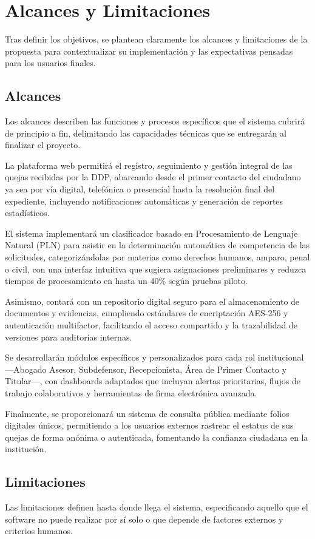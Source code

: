 \section{Alcances y Limitaciones}
Tras definir los objetivos, se plantean claramente los alcances y limitaciones de la propuesta para contextualizar su implementación y las expectativas pensadas para los usuarios finales.

\subsection{Alcances}
Los alcances describen las funciones y procesos específicos que el sistema cubrirá de principio a fin, delimitando las capacidades técnicas que se entregarán al finalizar el proyecto.

La plataforma web permitirá el registro, seguimiento y gestión integral de las quejas recibidas por la DDP, abarcando desde el primer contacto del ciudadano ya sea por vía digital, telefónica o presencial hasta la resolución final del expediente, incluyendo notificaciones automáticas y generación de reportes estadísticos. 

El sistema implementará un clasificador basado en Procesamiento de Lenguaje Natural (PLN) para asistir en la determinación automática de competencia de las solicitudes, categorizándolas por materias como derechos humanos, amparo, penal o civil, con una interfaz intuitiva que sugiera asignaciones preliminares y reduzca tiempos de procesamiento en hasta un 40\% según pruebas piloto. 

Asimismo, contará con un repositorio digital seguro para el almacenamiento de documentos y evidencias, cumpliendo estándares de encriptación AES-256 y autenticación multifactor, facilitando el acceso compartido y la trazabilidad de versiones para auditorías internas. 

Se desarrollarán módulos específicos y personalizados para cada rol institucional —Abogado Asesor, Subdefensor, Recepcionista, Área de Primer Contacto y Titular—, con dashboards adaptados que incluyan alertas prioritarias, flujos de trabajo colaborativos y herramientas de firma electrónica avanzada. 

Finalmente, se proporcionará un sistema de consulta pública mediante folios digitales únicos, permitiendo a los usuarios externos rastrear el estatus de sus quejas de forma anónima o autenticada, fomentando la confianza ciudadana en la institución.
\subsection{Limitaciones}
Las limitaciones definen hasta donde llega el sistema, especificando aquello que el software no puede realizar por sí solo o que depende de factores externos y criterios humanos.

